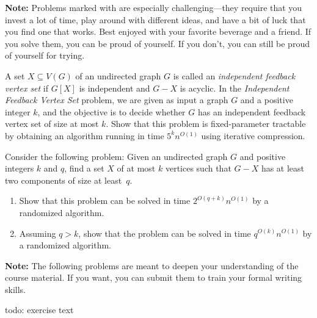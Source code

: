 \documentclass{uebung_cs}
\begin{document}
\textbf{Note:} Problems marked with \hard are especially challenging---they require that you invest a lot of time, play around with different ideas, and have a bit of luck that you find one that works. Best enjoyed with your favorite beverage and a friend. If you solve them, you can be proud of yourself. If you don't, you can still be proud of yourself for trying.

\begin{exercise}
A set $X \subseteq V(G)$ of an undirected graph $G$ is called an \emph{independent feedback vertex set} if $G[X]$ is independent and $G - X$ is acyclic. In the \emph{Independent Feedback Vertex Set} problem, we are given as input a graph $G$ and a positive integer $k$, and the objective is to decide whether $G$ has an independent feedback vertex set of size at most $k$. Show that this problem is fixed-parameter tractable by obtaining an algorithm running in time $5^kn^{O(1)}$ using iterative compression.
\end{exercise}

\begin{exercise}[\hard]
Consider the following problem: Given an undirected graph $G$ and positive integers $k$ and $q$, find a set $X$ of at most $k$ vertices such that $G - X$ has at least two components of size at least~$q$.
\begin{enumerate}
\item Show that this problem can be solved in time $2^{O(q+k)}n^{O(1)}$ by a randomized algorithm.
\item Assuming $q>k$, show that the problem can be solved in time $q^{O(k)}n^{O(1)}$ by a randomized algorithm.
\end{enumerate}
\end{exercise}


\newpage
\textbf{Note:} The following problems are meant to deepen your understanding of the course material. If you want, you can submit them to train your formal writing skills.

\begin{exercise}
  todo: exercise text
\end{exercise}
\end{document}
